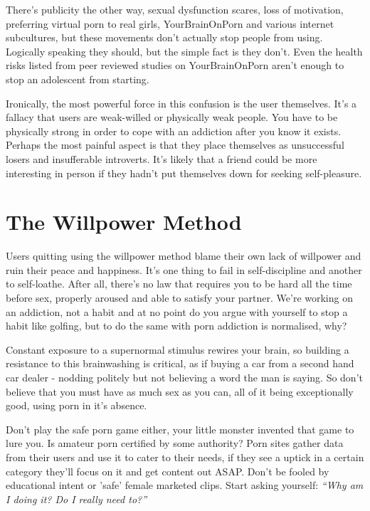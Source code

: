 \documentclass[
]{book}
\begin{document}
There's publicity the other way, sexual dysfunction scares, loss of motivation, preferring virtual porn to real girls, YourBrainOnPorn and various internet subcultures, but these movements don't actually stop people from using. Logically speaking they should, but the simple fact is they don't. Even the health risks listed from peer reviewed studies on YourBrainOnPorn aren't enough to stop an adolescent from starting.

Ironically, the most powerful force in this confusion is the user themselves. It's a fallacy that users are weak-willed or physically weak people. You have to be physically strong in order to cope with an addiction after you know it exists. Perhaps the most painful aspect is that they place themselves as unsuccessful losers and insufferable introverts. It's likely that a friend could be more interesting in person if they hadn't put themselves down for seeking self-pleasure.

\hypertarget{the-willpower-method}{%
\section{The Willpower Method}\label{the-willpower-method}}

Users quitting using the willpower method blame their own lack of willpower and ruin their peace and happiness. It's one thing to fail in self-discipline and another to self-loathe. After all, there's no law that requires you to be hard all the time before sex, properly aroused and able to satisfy your partner. We're working on an addiction, not a habit and at no point do you argue with yourself to stop a habit like golfing, but to do the same with porn addiction is normalised, why?

Constant exposure to a supernormal stimulus rewires your brain, so building a resistance to this brainwashing is critical, as if buying a car from a second hand car dealer - nodding politely but not believing a word the man is saying. So don't believe that you must have as much sex as you can, all of it being exceptionally good, using porn in it's absence.

Don't play the safe porn game either, your little monster invented that game to lure you. Is amateur porn certified by some authority? Porn sites gather data from their users and use it to cater to their needs, if they see a uptick in a certain category they'll focus on it and get content out ASAP. Don't be fooled by educational intent or 'safe' female marketed clips. Start asking yourself: \emph{``Why am I doing it? Do I really need to?''}
\end{document}
